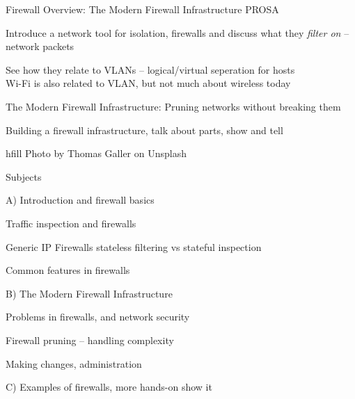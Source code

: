 \documentclass[Screen16to9,17pt]{foils}
\begin{document}
\mytitlepage
{Firewall Overview: The Modern Firewall Infrastructure}
{PROSA}


\hlkprofiluk




\begin{list2}
\item Introduce a network tool for isolation, firewalls and discuss what they \emph{filter on} -- network packets
\item See how they relate to VLANs -- logical/virtual seperation for hosts\\
Wi-Fi is also related to VLAN, but not much about wireless today
\item The Modern Firewall Infrastructure: Pruning networks without breaking them
\item Building a firewall infrastructure, talk about parts, show and tell
\end{list2}

hfill {\small Photo by Thomas Galler on Unsplash}



\begin{list1}
\item Subjects
\item A) Introduction and firewall basics
\begin{list2}
\item Traffic inspection and firewalls
\item Generic IP Firewalls stateless filtering vs stateful inspection
\item Common features in firewalls
\end{list2}
\item B) The Modern Firewall Infrastructure
\begin{list2}
\item Problems in firewalls, and network security
\item Firewall pruning -- handling complexity
\item Making changes, administration
\end{list2}
\item C) Examples of firewalls, more hands-on show it
\end{list1}

\end{document}
